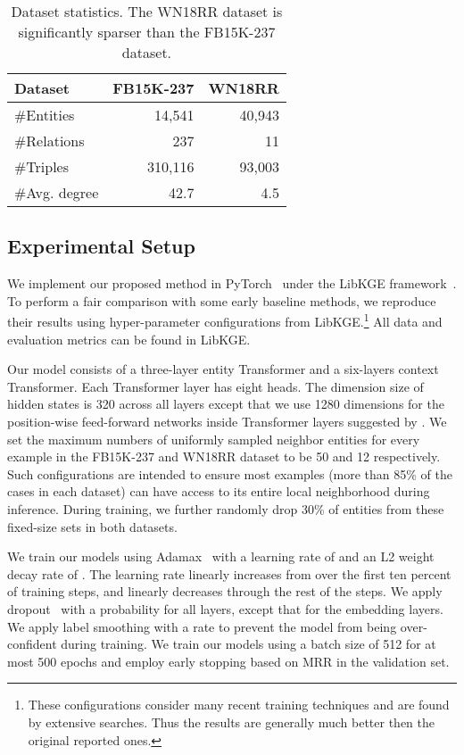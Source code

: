 \documentclass[11pt]{article}
\begin{document}
\begin{table}[t]
\centering
\begin{tabular}{lrr}
\toprule
Dataset       & FB15K-237 & WN18RR \\\midrule
\#Entities    & 14,541    & 40,943 \\
\#Relations   & 237       & 11     \\
\#Triples     & 310,116   & 93,003 \\
\#Avg. degree & 42.7      & 4.5   \\\bottomrule
\end{tabular}
\caption{Dataset statistics. The WN18RR dataset is significantly sparser than the FB15K-237 dataset.}
\label{tab:datasets}
\end{table} 

\subsection{Experimental Setup}
\label{sec:exp_setup}
We implement our proposed method in PyTorch~\cite{pytorch} under the LibKGE framework~\cite{broscheit-etal-2020-libkge}.
To perform a fair comparison with some early baseline methods, we reproduce their results using hyper-parameter configurations from LibKGE.\footnote{These configurations consider many recent training techniques and are found by extensive searches. Thus the results are generally much better then the original reported ones.} All data and evaluation metrics can be found in LibKGE.

Our model consists of a three-layer entity Transformer and a six-layers context Transformer. Each Transformer layer has eight heads. The dimension size of hidden states is 320 across all layers except that we use 1280 dimensions for the position-wise feed-forward networks inside Transformer layers suggested by \citet{vaswani2017attention}.
We set the maximum numbers of uniformly sampled neighbor entities for every example in the FB15K-237 and WN18RR dataset to be 50 and 12 respectively.
Such configurations are intended to ensure most examples (more than 85\% of the cases in each dataset) can have access to its entire local neighborhood during inference.
During training, we further randomly drop 30\% of entities from these fixed-size sets in both datasets.

We train our models using Adamax~\cite{kingma2014adam} with a learning rate of  and an L2 weight decay rate of .
The learning rate linearly increases from  over the first ten percent of training steps, and linearly decreases through the rest of the steps.
We apply dropout~\cite{srivastava2014dropout} with a probability  for all layers, except that  for the embedding layers. 
We apply label smoothing with a rate  to prevent the model from being over-confident during training.
We train our models using a batch size of 512 for at most 500 epochs and employ early stopping based on MRR in the validation set.
\end{document}

